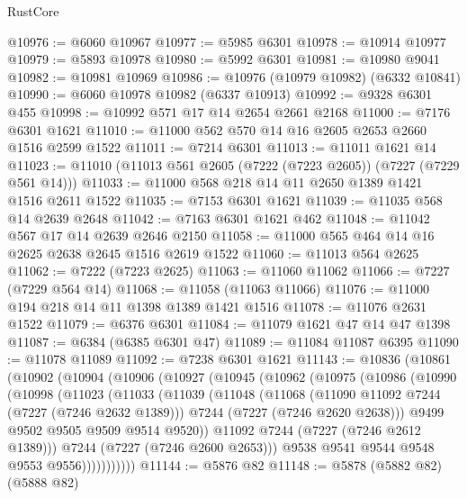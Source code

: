 \begin{lexlean}{RustCore}
\begin{coremodule}
@10976 := @6060 @10967
@10977 := @5985 @6301
@10978 := @10914 @10977
@10979 := @5893 @10978
@10980 := @5992 @6301
@10981 := @10980 @9041
@10982 := @10981 @10969
@10986 := @10976 (@10979 @10982) (@6332 @10841)
@10990 := @6060 @10978 @10982 (@6337 @10913)
@10992 := @9328 @6301 @455
@10998 := @10992 @571 @17 @14 @2654 @2661 @2168
@11000 := @7176 @6301 @1621
@11010 := @11000 @562 @570 @14 @16 @2605 @2653 @2660 @1516 @2599 @1522
@11011 := @7214 @6301
@11013 := @11011 @1621 @14
@11023 := @11010 (@11013 @561 @2605 (@7222 (@7223 @2605)) (@7227 (@7229 @561 @14)))
@11033 := @11000 @568 @218 @14 @11 @2650 @1389 @1421 @1516 @2611 @1522
@11035 := @7153 @6301 @1621
@11039 := @11035 @568 @14 @2639 @2648
@11042 := @7163 @6301 @1621 @462
@11048 := @11042 @567 @17 @14 @2639 @2646 @2150
@11058 := @11000 @565 @464 @14 @16 @2625 @2638 @2645 @1516 @2619 @1522
@11060 := @11013 @564 @2625
@11062 := @7222 (@7223 @2625)
@11063 := @11060 @11062
@11066 := @7227 (@7229 @564 @14)
@11068 := @11058 (@11063 @11066)
@11076 := @11000 @194 @218 @14 @11 @1398 @1389 @1421 @1516
@11078 := @11076 @2631 @1522
@11079 := @6376 @6301
@11084 := @11079 @1621 @47 @14 @47 @1398
@11087 := @6384 (@6385 @6301 @47)
@11089 := @11084 @11087 @6395
@11090 := @11078 @11089
@11092 := @7238 @6301 @1621
@11143 := @10836
    (@10861
      (@10902
        (@10904
          (@10906
            (@10927
              (@10945
                (@10962
                  (@10975
                    (@10986
                      (@10990
                        (@10998
                          (@11023
                            (@11033
                              (@11039
                                (@11048
                                  (@11068
                                    (@11090 @11092 @7244 (@7227 (@7246 @2632 @1389)))
                                    @7244
                                    (@7227 (@7246 @2620 @2638)))
                                  @9499
                                  @9502
                                  @9505
                                  @9509
                                  @9514
                                  @9520))
                              @11092
                              @7244
                              (@7227 (@7246 @2612 @1389)))
                            @7244
                            (@7227 (@7246 @2600 @2653)))
                          @9538
                          @9541
                          @9544
                          @9548
                          @9553
                          @9556)))))))))))
@11144 := @5876 @82
@11148 := @5878 (@5882 @82) (@5888 @82)

\end{coremodule}
\end{lexlean}
